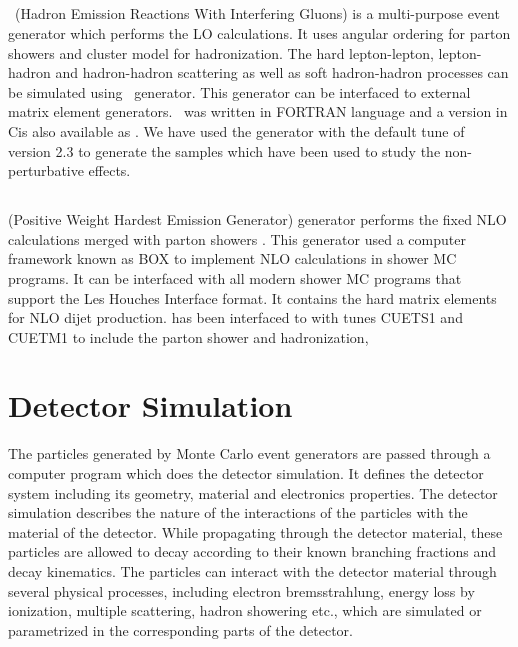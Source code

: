 \subsection{\HERWIG}
\HERWIG~(Hadron Emission Reactions With Interfering Gluons) \cite{Corcella:2000bw} is a multi-purpose event generator which performs the LO calculations. It uses angular ordering for parton showers and cluster model for hadronization. The hard lepton-lepton, lepton-hadron and hadron-hadron scattering as well as soft hadron-hadron processes can be simulated using \HERWIG~generator. This generator can be interfaced to external matrix element generators. \HERWIG~was written in FORTRAN language and a version in C\plusn\plusn is also available as \HERWIGPP \cite{Bahr:2008pv}. We have used the \HERWIGPP generator with the default tune of version 2.3 \cite{Bahr:2008tf} to generate the samples which have been used to study the non-perturbative effects. 

\subsection{\POWHEG}
\POWHEG (Positive Weight Hardest Emission Generator) generator performs the fixed NLO calculations merged with parton showers \cite{Frixione:2007vw, Nason:2004rx, Alioli:2010xa}. This generator used a computer framework known as \POWHEG BOX \cite{Oleari:2010nx} to implement NLO calculations in shower MC programs. It can be interfaced with all modern shower MC programs that support the Les Houches Interface format. It contains the hard matrix elements for NLO dijet production. \POWHEG has been interfaced to \PYTHIAE with tunes CUETS1 and CUETM1 to include the parton shower and hadronization, 
\section{Detector Simulation}
The particles generated by Monte Carlo event generators are passed through a computer program which does the detector simulation. It defines the detector system including its geometry, material and electronics properties. The detector simulation describes the nature of the interactions of the particles with the material of the detector. While propagating through the detector material, these particles are allowed to decay according to their known branching fractions and decay kinematics. The particles can interact with the detector material through several physical processes, including electron bremsstrahlung, energy loss by ionization, multiple scattering, hadron showering etc., which are simulated or parametrized in the corresponding parts of the detector. 

